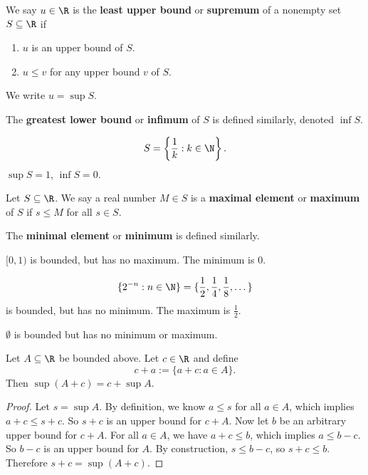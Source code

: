 \begin{definition}
  We say $u \in \R$ is the \textbf{least upper bound}
  or \textbf{supremum} of a nonempty set $S \subseteq \R$
  if
  \begin{enumerate}
    \item $u$ is an upper bound of $S$.
    \item $u \le v$ for any upper bound $v$ of $S$.
  \end{enumerate}
  We write $u = \sup S$.
\end{definition}

The \textbf{greatest lower bound} or \textbf{infimum}
of $S$ is defined similarly, denoted $\inf S$.

\begin{tcolorbox}
  \[S = \left\{\frac{1}{k} : k \in \N\right\}.\]
  $\sup S = 1$,  $\inf S = 0$.
\end{tcolorbox}

\begin{definition}
  Let $S \subseteq \R$. We say a real number
  $M \in S$ is a \textbf{maximal element} or
  \textbf{maximum} of $S$ if $s \le M$ for all
  $s \in S$.
\end{definition}

The \textbf{minimal element} or \textbf{minimum}
is defined similarly.

\begin{tcolorbox}
  $[0, 1)$ is bounded, but has no maximum. The minimum is
  $0$.
\end{tcolorbox}

\begin{tcolorbox}
  \[\{2^{-n} : n \in \N\} = \{\frac{1}{2}, \frac{1}{4}, \frac{1}{8}, \dots\}\]
  is bounded, but has no minimum. The maximum is
  $\frac{1}{2}$.
\end{tcolorbox}

\begin{tcolorbox}
  $\emptyset$ is bounded but has no minimum or maximum.
\end{tcolorbox}

\begin{exercise}
  Let $A \subseteq \R$ be bounded above. Let  $c \in \R$
  and define
  \[c + a := \{a + c : a \in A\}.\]
  Then  $\sup (A + c) = c + \sup A$.
\end{exercise}

\begin{proof}
  Let $s = \sup A$. By definition, we know  $a \le s$
  for all  $a \in A$, which implies
  $a + c \le s + c$. So $s + c$ is an upper bound
  for $c + A$.
  Now let  $b$ be an arbitrary upper bound
  for $c + A$.  For all $a \in A$, we have
  $a + c \le b$, which implies $a \le b - c$. So
  $b - c$ is an upper bound for  $A$. By construction,
  $s \le b - c$, so $s + c \le b$. Therefore
  $s + c = \sup (A + c)$.
\end{proof}

